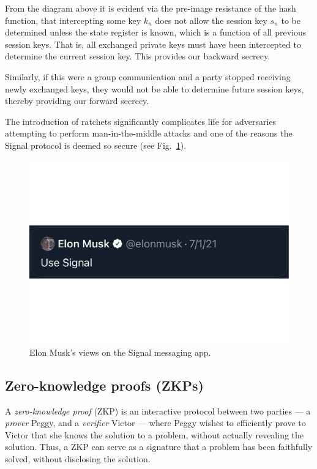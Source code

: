 From the diagram above it is evident via the pre-image resistance of the hash function, that intercepting some key $k_n$ does not allow the session key $s_n$ to be determined unless the state register is known, which is a function of all previous session keys. That is, all exchanged private keys must have been intercepted to determine the current session key. This provides our backward secrecy.

Similarly, if this were a group communication and a party stopped receiving newly exchanged keys, they would not be able to determine future session keys, thereby providing our forward secrecy.

The introduction of ratchets significantly complicates life for adversaries attempting to perform man-in-the-middle attacks and one of the reasons the Signal protocol is deemed so secure (see Fig.~\ref{fig:musk}).

\begin{figure}[!htb]
	\centering
	\includegraphics[width=\columnwidth]{figures/Musk}
	\caption{Elon Musk's views on the Signal messaging app.} \label{fig:musk}
\end{figure} 

\subsection{Zero-knowledge proofs (ZKPs)}

A \textit{zero-knowledge proof} (ZKP) is an interactive protocol between two parties --- a \textit{prover} Peggy, and a \textit{verifier} Victor --- where Peggy wishes to efficiently prove to Victor that she knows the solution to a problem, without actually revealing the solution. Thus, a ZKP can serve as a signature that a problem has been faithfully solved, without disclosing the solution.

